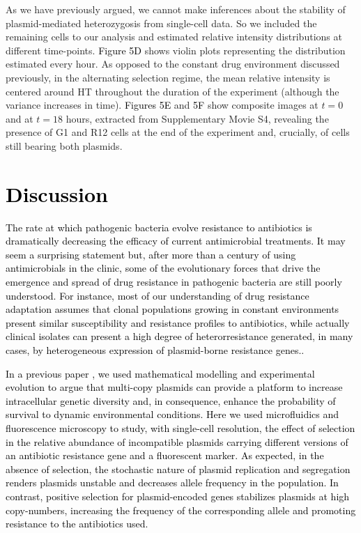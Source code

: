 \documentclass[fleqn,12pt]{wlscirep}
\newcommand{\doing}[1]{\textcolor{gray}{#1}}
\newcommand{\blue}[1]{\textcolor{black}{#1}}
\newcommand{\fig}[1]{\textcolor{black}{#1}}
\begin{document}
As we have previously argued, we cannot make inferences about the stability of plasmid-mediated heterozygosis from single-cell data. So we included the remaining cells to our analysis and estimated relative intensity distributions at different time-points.  \fig{Figure 5D} shows violin plots representing the distribution estimated every hour.  As opposed to the constant drug environment discussed previously, in the alternating selection regime, the mean relative intensity is centered around HT throughout the duration of the experiment (although the variance increases in time).  \fig{Figures 5E} and \fig{5F} show composite images at $t=0$ and at $t=18$ hours, extracted from Supplementary Movie S4, revealing the presence of G1 and R12 cells at the end of the experiment and, crucially, of cells still bearing both plasmids. 




\section{\blue{Discussion}}

\blue{The rate at which pathogenic bacteria evolve resistance to antibiotics is dramatically decreasing the efficacy of current antimicrobial treatments. It may seem a surprising statement but, after more than a century of using antimicrobials in the clinic, some of the evolutionary forces that drive the emergence and spread of drug resistance in pathogenic bacteria are still poorly understood. For instance, most of our understanding of drug resistance adaptation assumes that clonal populations growing in constant environments present similar susceptibility and resistance profiles to antibiotics, while actually clinical isolates can present a high degree of heterorresistance generated, in many cases, by heterogeneous expression of plasmid-borne resistance genes.\cite{andersson2019mechanisms}. }

\blue{In a previous paper \cite{Rodriguez2018}, we used mathematical modelling and experimental evolution to argue that multi-copy plasmids can provide a platform to increase intracellular genetic diversity and, in consequence, enhance the probability of survival to dynamic environmental conditions.}
\blue{Here we used microfluidics and fluorescence microscopy to study, with single-cell resolution, the effect of selection in the relative abundance of incompatible plasmids carrying different versions of an antibiotic resistance gene and a fluorescent marker.} 
\blue{As expected, in the absence of selection, the stochastic nature of plasmid replication and segregation renders plasmids unstable and decreases allele frequency in the population.  In contrast, positive selection for plasmid-encoded genes stabilizes plasmids at high copy-numbers, increasing the frequency of the corresponding allele and promoting resistance to the antibiotics used. }
\end{document}
